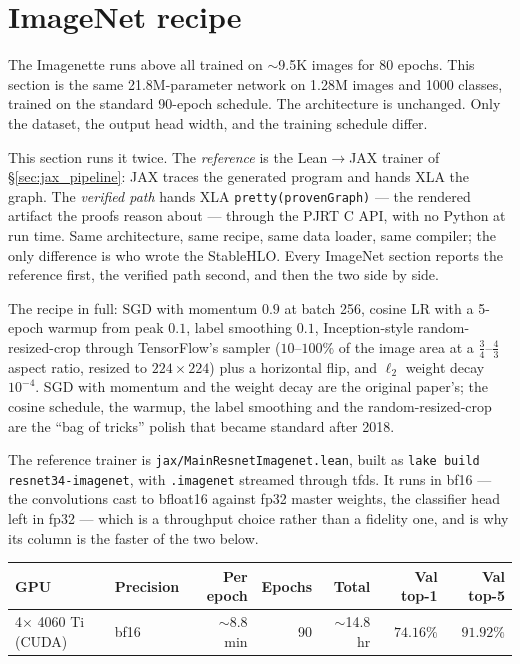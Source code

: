 \section{ImageNet recipe}

The Imagenette runs above all trained on $\sim$9.5K images for 80
epochs. This section is the same 21.8M-parameter network on 1.28M images
and 1000 classes, trained on the standard 90-epoch schedule. The
architecture is unchanged. Only the dataset, the output head width, and
the training schedule differ.

This section runs it twice. The \emph{reference} is the
Lean$\to$JAX trainer of \S\ref{sec:jax_pipeline}: JAX traces the generated
program and hands XLA the graph. The \emph{verified path} hands XLA
\texttt{pretty(provenGraph)} --- the rendered artifact the proofs reason
about --- through the PJRT C API, with no Python at run time. Same
architecture, same recipe, same data loader, same compiler; the only
difference is who wrote the StableHLO. Every ImageNet section reports the
reference first, the verified path second, and then the two side by side.

The recipe in full: SGD with momentum $0.9$ at batch 256, cosine LR with a
5-epoch warmup from peak $0.1$, label smoothing $0.1$, Inception-style
random-resized-crop through TensorFlow's sampler ($10$--$100\%$ of the
image area at a $\frac{3}{4}$--$\frac{4}{3}$ aspect ratio, resized to
$224\times224$) plus a horizontal flip, and $\ell_2$ weight decay
$10^{-4}$. SGD with momentum and the weight decay are the original paper's;
the cosine schedule, the warmup, the label smoothing and the
random-resized-crop are the ``bag of tricks'' polish that became standard
after 2018.


The reference trainer is \texttt{jax/MainResnetImagenet.lean}, built as
\texttt{lake build resnet34-imagenet}, with \texttt{.imagenet} streamed
through tfds. It runs in bf16 --- the convolutions cast to bfloat16
against fp32 master weights, the classifier head left in fp32 --- which is
a throughput choice
rather than a fidelity one, and is why its column is the faster of the
two below.

\begin{center}
\begin{tabular}{l l r r r r r}
\hline
GPU & Precision & Per epoch & Epochs & Total & Val top-1 & Val top-5 \\
\hline
4$\times$ 4060 Ti (CUDA) & bf16 & $\sim$8.8 min & 90 & $\sim$14.8 hr & $\mathbf{74.16\%}$ & $\mathbf{91.92\%}$ \\
\hline
\end{tabular}
\end{center}

